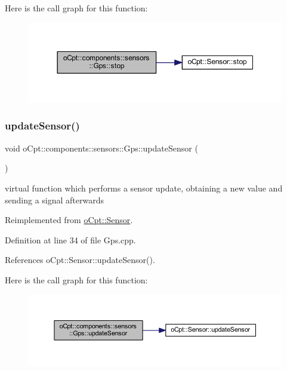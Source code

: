 Here is the call graph for this function\+:\nopagebreak
\begin{figure}[H]
\begin{center}
\leavevmode
\includegraphics[width=350pt]{classo_cpt_1_1components_1_1sensors_1_1_gps_a9206c32fa91311740ae920c01eed6094_cgraph}
\end{center}
\end{figure}
\hypertarget{classo_cpt_1_1components_1_1sensors_1_1_gps_a95976c5d8bba650d2732d4eb43979283}{}\label{classo_cpt_1_1components_1_1sensors_1_1_gps_a95976c5d8bba650d2732d4eb43979283} 
\subsubsection{\texorpdfstring{update\+Sensor()}{updateSensor()}}
{\footnotesize\ttfamily void o\+Cpt\+::components\+::sensors\+::\+Gps\+::update\+Sensor (\begin{DoxyParamCaption}{ }\end{DoxyParamCaption})\hspace{0.3cm}{\ttfamily [virtual]}}

virtual function which performs a sensor update, obtaining a new value and sending a signal afterwards 

Reimplemented from \hyperlink{classo_cpt_1_1_sensor_ab4b0dedb06f11bcf2368852035beb2b2}{o\+Cpt\+::\+Sensor}.



Definition at line 34 of file Gps.\+cpp.



References o\+Cpt\+::\+Sensor\+::update\+Sensor().

Here is the call graph for this function\+:\nopagebreak
\begin{figure}[H]
\begin{center}
\leavevmode
\includegraphics[width=350pt]{classo_cpt_1_1components_1_1sensors_1_1_gps_a95976c5d8bba650d2732d4eb43979283_cgraph}
\end{center}
\end{figure}


